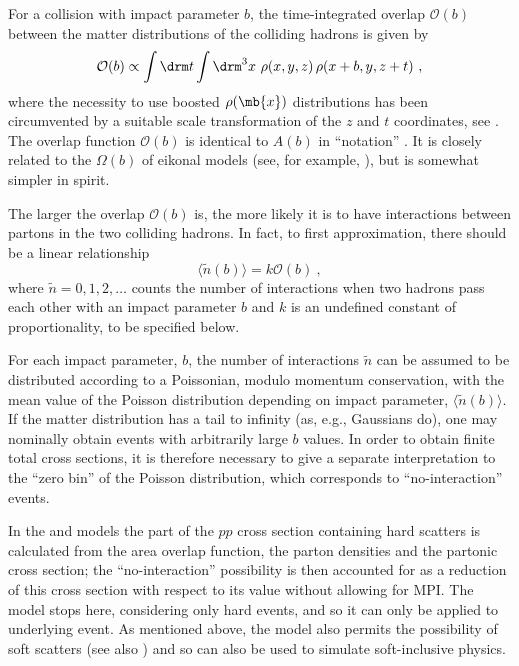For a collision with impact parameter $b$, the time-integrated
overlap $\mathcal{O}(b)$ between the matter distributions of the
colliding hadrons is given by
\begin{equation}
\mathcal{O}(b) \propto \int \drm t \int \drm^3 x \, \,
\rho(x,y,z) \, \rho(x+b,y,z+t)     ~,
\end{equation}
where the necessity to use boosted $\rho(\mb{x})$ distributions
has been circumvented by a suitable scale transformation of the $z$
and $t$ coordinates, see \cite{Sjostrand:1987su}. The overlap function
$\mathcal{O}(b)$ is identical
to $A(b)$ in ``\jimmy notation''
\cite{Butterworth:1996zw,Bahr:2008dy}. It is
closely  related to the $\Omega(b)$ of eikonal models
(see, for example, \cite{Bourrely:2002wr,Borozan:2002fk,Treleani:2007gi}),
but is somewhat simpler in spirit.

The larger the overlap $\mathcal{O}(b)$ is, the more likely it is to
have interactions between partons in the two colliding hadrons.
In fact, to first approximation, there should be a linear relationship
\begin{equation}
\langle \tilde{n}(b) \rangle = k \mathcal{O}(b) ~,
\label{eq:bdepend}
\end{equation}
where $\tilde{n} = 0, 1, 2, \ldots$ counts the number of interactions
when two hadrons pass each other with an impact parameter $b$ and
$k$ is an undefined constant of proportionality, to be specified
below.

For each impact parameter, $b$, the number of interactions $\tilde{n}$
can be assumed to be distributed according to a Poissonian,
modulo momentum conservation, with the mean value of the Poisson
distribution depending on impact
parameter, $\langle \tilde{n}(b)\rangle$. If the matter
distribution has a tail to infinity (as, e.g., Gaussians do),
one may nominally obtain events with arbitrarily large $b$ values.
In order to obtain finite total cross sections, it is therefore
necessary to give a separate interpretation to the ``zero bin'' of the
Poisson distribution, which corresponds to ``no-interaction'' events.

In the \jimmy \cite{Butterworth:1996zw} and \herwigpp
\cite{Bahr:2008dy} models the part of the $pp$ cross section
containing hard scatters is calculated from the area
overlap function, the parton densities and the partonic cross section;
the ``no-interaction'' possibility is then accounted for as a
reduction of this cross section with respect to its value without
allowing for MPI. The \jimmy model stops here, considering only hard events,
and so it can only be applied to underlying event. As mentioned above,
the \herwigpp model also permits the possibility of soft scatters
(see also ) and so can also be used to
simulate soft-inclusive physics.

